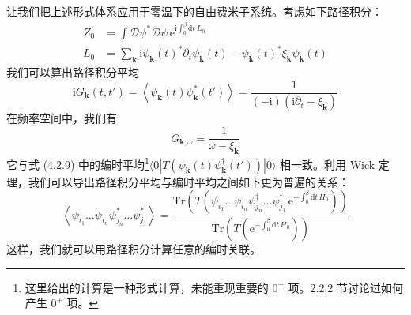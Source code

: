 让我们把上述形式体系应用于零温下的自由费米子系统。考虑如下路径积分：
\begin{align*}
Z_{0} &= \int \mathcal{D}\psi^{*}\mathcal{D}\psi\,\mathrm{e}^{\mathrm{i}\int_{0}^{\beta}\mathrm{d}t\,L_{0}}\\
L_{0} &= \sum_{\pmb{k}}\mathrm{i}\psi_{\pmb{k}}(t)^{*}\partial_{t}\psi_{\pmb{k}}(t)-\psi_{\pmb{k}}(t)^{*}\xi_{\pmb{k}}\psi_{\pmb{k}}(t)
\end{align*}
我们可以算出路径积分平均
\begin{equation*}
\mathrm{i}G_{\pmb{k}}(t,t')=\left\langle \psi_{\pmb{k}}(t)\psi_{\pmb{k}}^{*}(t')\right\rangle=\frac{1}{(-\mathrm{i})(\mathrm{i}\partial_{t}-\xi_{\pmb{k}})}
\end{equation*}
在频率空间中，我们有
\begin{equation*}
G_{\pmb{k},\omega}=\frac{1}{\omega-\xi_{\pmb{k}}}
\end{equation*}
它与式 (4.2.9) 中的编时平均\footnote{这里给出的计算是一种形式计算，未能重现重要的 $0^{+}$ 项。2.2.2 节讨论过如何产生 $0^{+}$ 项。}$\langle 0|T(\psi_{\pmb{k}}(t)\psi_{\pmb{k}}^{\dagger}(t'))|0\rangle$ 相一致。利用 Wick 定理，我们可以导出路径积分平均与编时平均之间如下更为普遍的关系：
\begin{equation*}
\left\langle \psi_{i_{1}}\dots\psi_{i_{n}}\psi_{j_{n}}^{*}\dots\psi_{j_{1}}^{*}\right\rangle=\frac{\mathrm{Tr}\left(T(\psi_{i_{1}}\dots\psi_{i_{n}}\psi_{j_{n}}^{\dagger}\dots\psi_{j_{1}}^{\dagger}\,\mathrm{e}^{-\int_{0}^{\beta}\mathrm{d}t\,H_{0}})\right)}{\mathrm{Tr}\left(T(\mathrm{e}^{-\int_{0}^{\beta}\mathrm{d}t\,H_{0}})\right)}
\end{equation*}
这样，我们就可以用路径积分计算任意的编时关联。

